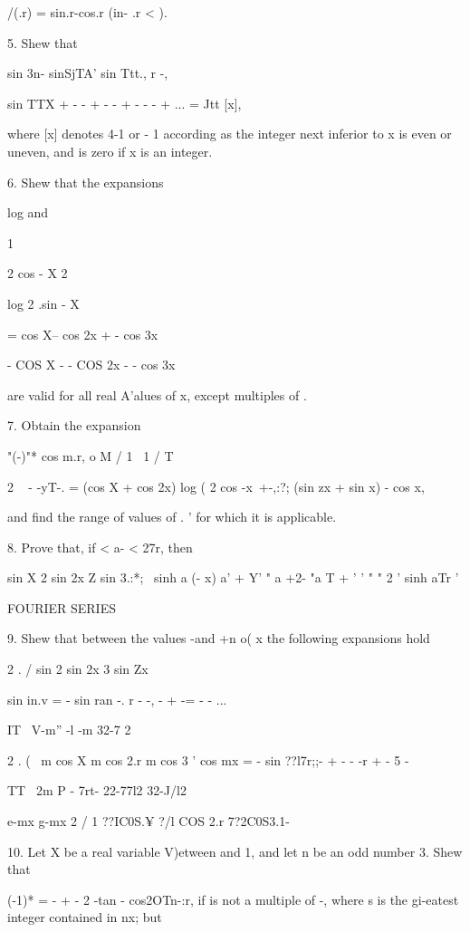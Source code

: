 /(.r) = sin.r-cos.r (in- .r < \pi). 

5. Shew that

sin 3n- sinSjTA' sin Ttt., r -,

sin TTX + - - + - - + - - - + ... = Jtt [x],

where [x] denotes 4-1 or - 1 according as the integer next inferior to
x is even or uneven, and is zero if x is an integer. 

6. Shew that the expansions

log and

1

2 cos - X 2

log 2 .sin - X

= cos X-- cos 2x + - cos 3x

- COS X - - COS 2x - - cos 3x

are valid for all real A'alues of x, except multiples of \pi.

7. Obtain the expansion

"(-)"* cos m.r, o M / 1 \ 1 /  T  \

2 ~ - -yT-. = (cos X + cos 2x) log ( 2 cos -x\ +-,:?; (sin zx + sin x)
- cos x,

and find the range of values of . ' for which it is applicable.

8. Prove that, if < a- < 27r, then

sin X 2 sin 2x Z sin 3.:*; \ \pi sinh a (\pi - x) a' + Y' " a +2- "a T +
' ' " " 2 ' sinh aTr '


FOURIER SERIES

%
%

9. Shew that between the values -\pi and +n o( x the following
expansions hold

2 . / sin 2 sin 2x 3 sin Zx

sin in.v = - sin ran -. r - -, - + -= - - ...

IT \ V-m'' -l -m 32-7 2

2 . ( \ m cos X m cos 2.r m cos 3 ' cos mx = - sin ??l7r;;- + - - -r
+ - 5 -

TT \ 2m P - 7rt- 22-77l2 32-J/l2

e-mx g-mx 2 / 1 ??IC0S.¥ ?/l COS 2.r 7?2C0S3.1- \

10. Let X be a real variable V)etween and 1, and let n be an odd
number 3. Shew that

(-1)* = - + - 2 -tan - cos2OTn-:r, if is not a multiple of -, where s
is the gi-eatest integer contained in nx; but

